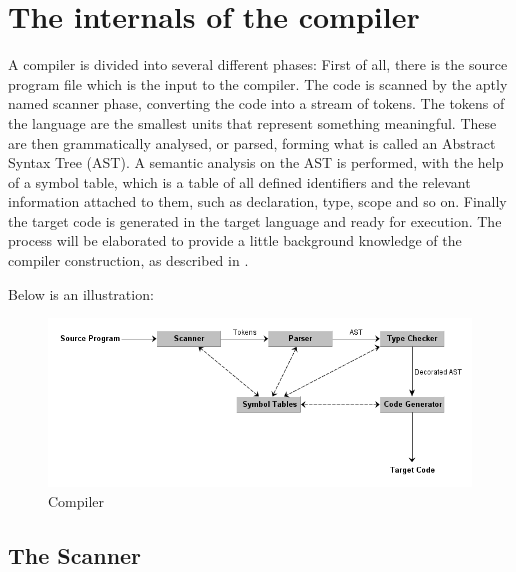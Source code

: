 \section{The internals of the compiler}

A compiler is divided into several different phases: First of all, there is the source program file which is the input to the compiler. The code is scanned by the aptly named scanner phase, converting the code into a stream of tokens. The tokens of the language are the smallest units that represent something meaningful. These are then grammatically analysed, or parsed, forming what is called an Abstract Syntax Tree (AST). A semantic analysis on the AST is performed, with the help of a symbol table, which is a table of all defined identifiers and the relevant information attached to them, such as declaration, type, scope and so on. Finally the target code is generated in the target language and ready for execution. The process will be elaborated to provide a little background knowledge of the compiler construction, as described in \cite{Fischer2010}.

Below is an illustration:

\begin{figure}[ht]
	\centering
		\includegraphics[scale = 0.5]{img/compiler.png}
	\caption{Compiler}
	\label{fig:compiler}
\end{figure}


\subsection{The Scanner}

